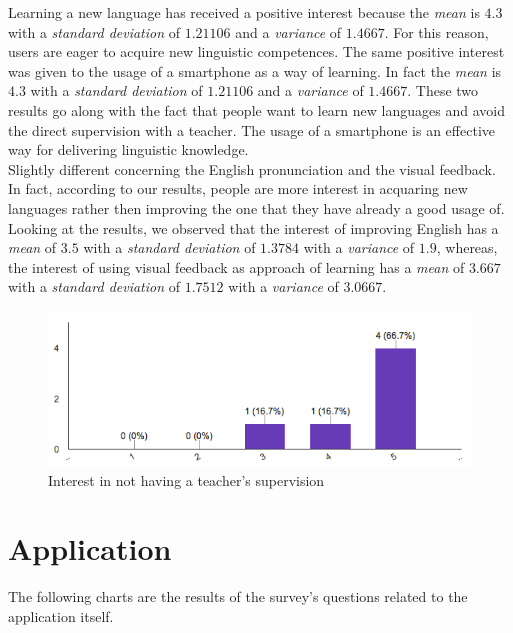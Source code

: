 \noindent Learning a new language has received a positive interest because the \textit{mean} is $4.3$ with a \textit{standard deviation} of $1.21106$ and a \textit{variance} of $1.4667$. For this reason, users are eager to acquire new linguistic competences. The same positive interest was given to the usage of a smartphone as a way of learning. In fact the \textit{mean} is $4.3$ with a \textit{standard deviation} of $1.21106$ and a \textit{variance} of $1.4667$. These two results go along with the fact that people want to learn new languages and avoid the direct supervision with a teacher. The usage of a smartphone is an effective way for delivering linguistic knowledge. \\

\noindent Slightly different concerning the English pronunciation and the visual feedback. In fact, according to our results, people are more interest in acquaring new languages rather then improving the one that they have already a good usage of. Looking at the results, we observed that the interest of improving English has a \textit{mean} of $3.5$ with a \textit{standard deviation} of $1.3784$ with a \textit{variance} of $1.9$, whereas, the interest of using visual feedback as approach of learning has a \textit{mean} of $3.667$ with a \textit{standard deviation} of $1.7512$ with a \textit{variance} of $3.0667$. 

\begin{figure}[!ht]
	\centering
	\includegraphics[scale=0.5]{Figures/responses/interest_no_teacher.png}
	\caption{Interest in not having a teacher's supervision}
	\label{fig:int_no_teacher}
\end{figure}

\section{Application}
\label{sub:Application}

\noindent The following charts are the results of the survey's questions related to the application itself.

